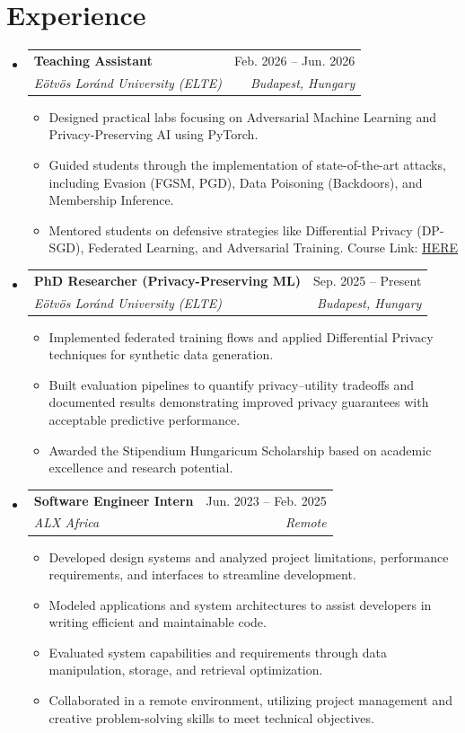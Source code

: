 \documentclass[letterpaper,11pt]{article}
\makeatletter
\newcommand{\resumeItem}[1]{
  \item\small{
    {#1 \vspace{0pt}}
  }
}
\newcommand{\resumeSubheading}[4]{
  \vspace{-2pt}\item
    \begin{tabular*}{\linewidth}[t]{l@{\extracolsep{\fill}}r}
      \textbf{#1} & \small #2 \hspace{1pt}\faCalendar* \\
      \textit{\small#3} & \small \textit{#4} \hspace{1pt}\faMapMarker* \\
    \end{tabular*}\vspace{-7pt}
}
\newcommand{\resumeSubHeadingListStart}{\begin{itemize}[leftmargin=0.15in, label={}, itemsep=2pt]}
\newcommand{\resumeSubHeadingListEnd}{\end{itemize}\vspace{-5pt}}
\newcommand{\resumeItemListStart}{\begin{itemize}[leftmargin=0.20in, itemsep=0pt]}
\newcommand{\resumeItemListEnd}{\end{itemize}\vspace{-5pt}}
\makeatother
\begin{document}
\section{Experience}
  \resumeSubHeadingListStart
    \resumeSubheading
      {Teaching Assistant}{Feb. 2026 -- Jun. 2026}
      {Eötvös Loránd University (ELTE)}{Budapest, Hungary}
      \resumeItemListStart
        \resumeItem{Designed practical labs focusing on Adversarial Machine Learning and Privacy-Preserving AI using PyTorch.}
        \resumeItem{Guided students through the implementation of state-of-the-art attacks, including Evasion (FGSM, PGD), Data Poisoning (Backdoors), and Membership Inference.}
        \resumeItem{Mentored students on defensive strategies like Differential Privacy (DP-SGD), Federated Learning, and Adversarial Training. Course Link: \href{https://elte-dsed.github.io/Intro-Data-Security/}{\underline{HERE}}}
      \resumeItemListEnd

    \resumeSubheading
      {PhD Researcher (Privacy-Preserving ML)}{Sep. 2025 -- Present}
      {Eötvös Loránd University (ELTE)}{Budapest, Hungary}
      \resumeItemListStart
        \resumeItem{Implemented federated training flows and applied Differential Privacy techniques for synthetic data generation.}
        \resumeItem{Built evaluation pipelines to quantify privacy--utility tradeoffs and documented results demonstrating improved privacy guarantees with acceptable predictive performance.}
        \resumeItem{Awarded the Stipendium Hungaricum Scholarship based on academic excellence and research potential.}
      \resumeItemListEnd

    \resumeSubheading
      {Software Engineer Intern}{Jun. 2023 -- Feb. 2025}
      {ALX Africa}{Remote}
      \resumeItemListStart
        \resumeItem{Developed design systems and analyzed project limitations, performance requirements, and interfaces to streamline development.}
        \resumeItem{Modeled applications and system architectures to assist developers in writing efficient and maintainable code.}
        \resumeItem{Evaluated system capabilities and requirements through data manipulation, storage, and retrieval optimization.}
        \resumeItem{Collaborated in a remote environment, utilizing project management and creative problem-solving skills to meet technical objectives.}
      \resumeItemListEnd
  \resumeSubHeadingListEnd
\end{document}
